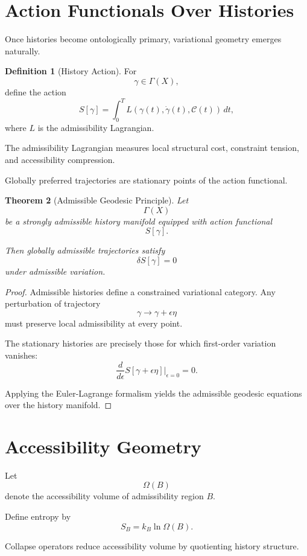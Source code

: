 \documentclass[12pt,openany]{book}
\theoremstyle{plain}
\newtheorem{theorem}{Theorem}[chapter]
\theoremstyle{definition}
\newtheorem{definition}[theorem]{Definition}
\theoremstyle{remark}
\begin{document}
\section{Action Functionals Over Histories}

Once histories become ontologically primary, variational geometry
emerges naturally.

\begin{definition}[History Action]
For
\[
\gamma \in \Gamma(X),
\]
define the action
\[
S[\gamma]
=
\int_0^T
L(\gamma(t),\dot{\gamma}(t),\mathcal{C}(t))
\,dt,
\]
where \(L\) is the admissibility Lagrangian.
\end{definition}

The admissibility Lagrangian measures local structural cost,
constraint tension, and accessibility compression.

Globally preferred trajectories are stationary points of the
action functional.

\begin{theorem}[Admissible Geodesic Principle]
Let
\[
\Gamma(X)
\]
be a strongly admissible history manifold equipped with action
functional
\[
S[\gamma].
\]

Then globally admissible trajectories satisfy
\[
\delta S[\gamma]=0
\]
under admissible variation.
\end{theorem}

\begin{proof}
Admissible histories define a constrained variational category.
Any perturbation of trajectory
\[
\gamma \to \gamma+\epsilon\eta
\]
must preserve local admissibility at every point.

The stationary histories are precisely those for which first-order
variation vanishes:
\[
\frac{d}{d\epsilon}
S[\gamma+\epsilon\eta]
\Big|_{\epsilon=0}
=
0.
\]

Applying the Euler-Lagrange formalism yields the admissible
geodesic equations over the history manifold.
\end{proof}

\section{Accessibility Geometry}

Let
\[
\Omega(B)
\]
denote the accessibility volume of admissibility region \(B\).

Define entropy by
\[
S_B
=
k_B \ln \Omega(B).
\]

Collapse operators reduce accessibility volume by quotienting
history structure.
\end{document}
